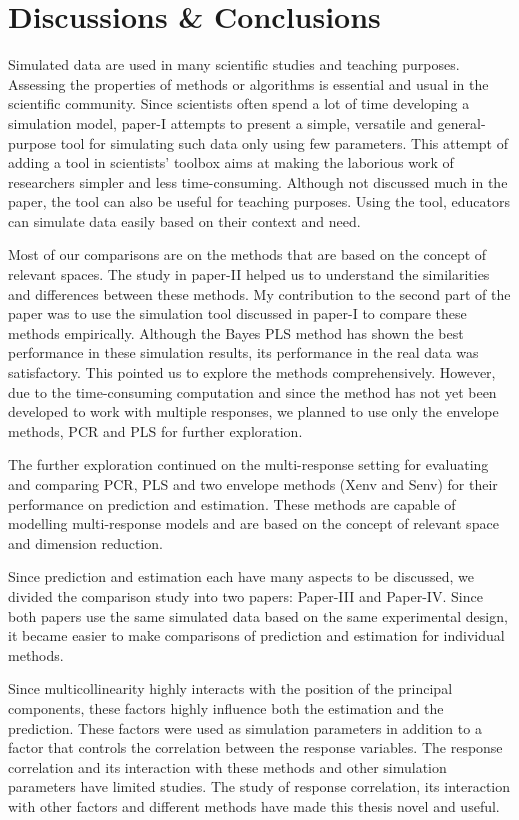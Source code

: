 \documentclass[11pt,twoside,openright,titlepage,
  headinclude,footinclude,BCOR=5mm,
  numbers=noenddot,cleardoublepage=empty,
  tablecaptionabove, dottedtoc,
  bibliography=totoc,paper=a4]{scrreprt}
\begin{document}
\hypertarget{discussions-conclusions}{%
\chapter{Discussions \& Conclusions}\label{discussions-conclusions}}

Simulated data are used in many scientific studies and teaching purposes. Assessing the properties of methods or algorithms is essential and usual in the scientific community. Since scientists often spend a lot of time developing a simulation model, paper-I attempts to present a simple, versatile and general-purpose tool for simulating such data only using few parameters. This attempt of adding a tool in scientists' toolbox aims at making the laborious work of researchers simpler and less time-consuming. Although not discussed much in the paper, the tool can also be useful for teaching purposes. Using the tool, educators can simulate data easily based on their context and need.

Most of our comparisons are on the methods that are based on the concept of relevant spaces. The study in paper-II helped us to understand the similarities and differences between these methods. My contribution to the second part of the paper was to use the simulation tool discussed in paper-I to compare these methods empirically. Although the Bayes PLS method has shown the best performance in these simulation results, its performance in the real data was satisfactory. This pointed us to explore the methods comprehensively. However, due to the time-consuming computation and since the method has not yet been developed to work with multiple responses, we planned to use only the envelope methods, PCR and PLS for further exploration.

The further exploration continued on the multi-response setting for evaluating and comparing PCR, PLS and two envelope methods (Xenv and Senv) for their performance on prediction and estimation. These methods are capable of modelling multi-response models and are based on the concept of relevant space and dimension reduction.

Since prediction and estimation each have many aspects to be discussed, we divided the comparison study into two papers: Paper-III and Paper-IV. Since both papers use the same simulated data based on the same experimental design, it became easier to make comparisons of prediction and estimation for individual methods.

Since multicollinearity highly interacts with the position of the principal components, these factors highly influence both the estimation and the prediction. These factors were used as simulation parameters in addition to a factor that controls the correlation between the response variables. The response correlation and its interaction with these methods and other simulation parameters have limited studies. The study of response correlation, its interaction with other factors and different methods have made this thesis novel and useful.
\end{document}

